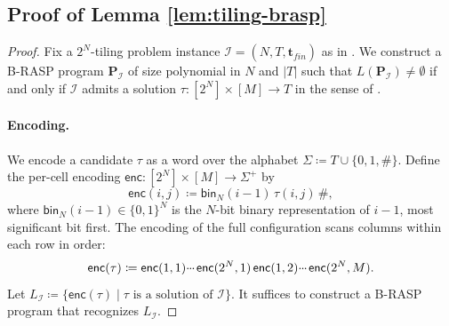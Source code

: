 \documentclass{article} %
\newcommand{\enc}{\mathsf{enc}}
\newcommand{\bin}{\mathsf{bin}}
\newcommand{\bnfdef}{\coloneqq}
\newcommand{\sym}[1]{\mathrm{#1}}
\newcommand{\alphabet}{\Sigma}
\newcommand{\brasp}{\boldsymbol{P}}
\newcommand{\Lang}{L}
\newcommand{\kplus}{^+}
\newcommand{\TI}{\mathcal{I}}
\newcommand{\tileset}{T}
\newcommand{\tilefin}{\boldsymbol{t}_{\mathit{fin}}}
\newcommand{\mydots}{%
  \ifmmode
    \mathord{.}\mkern-1mu\mathord{.}\mkern-1mu\mathord{.}%
  \else
    .\kern-0.1em.\kern-0.1em.%
  \fi
}
\newcommand{\mycdots}{%
  \ifmmode
    \mathord{\raisebox{0.45ex}{\ensuremath{\mydots}}}\mkern2mu%
  \else
    \raisebox{0.45ex}{.\kern-0.1em.\kern-0.1em.}\kern0.1em%
  \fi
}
\renewcommand{\cdots}{\mycdots}%
\begin{document}
\subsection{Proof of Lemma \ref{lem:tiling-brasp}}\label{app:tiling-brasp}
\lemTilingBrasp*
\begin{proof}
Fix a $2^N$-tiling problem instance $\TI = (N, \tileset, \tilefin)$ as in .
We construct a B-RASP program $\brasp_\TI$ of size polynomial in $N$ and $|\tileset|$ such that $\Lang(\brasp_\TI) \ne \emptyset$ if and only if $\TI$ admits a solution $\tau \colon [2^N] \times [M] \to \tileset$ in the sense of .

\paragraph{Encoding.}
We encode a candidate $\tau$ as a word over the alphabet $\alphabet \bnfdef \tileset \cup \{\sym{0}, \sym{1}, \sym{\#}\}$.
Define the per-cell encoding $\enc \colon [2^N] \times [M] \to \alphabet\kplus$ by
\begin{equation}\label{eq:enc}
\enc(i,j) \bnfdef \bin_N(i-1)\, \tau(i,j)\, \sym{\#},
\end{equation}
where $\bin_N(i-1) \in \{\sym{0},\sym{1}\}^N$ is the $N$-bit binary representation of $i-1$, most significant bit first.
The encoding of the full configuration scans columns within each row in order:
\begin{equation}\label{eq:enc-full}
\enc(\tau) \bnfdef \enc(1,1) \cdots \enc(2^N,1)\, \enc(1,2) \cdots \enc(2^N,M).
\end{equation}
Let $\Lang_\TI \bnfdef \{\enc(\tau) \mid \tau \text{ is a solution of } \TI\}$. It suffices to construct a B-RASP program that recognizes $\Lang_\TI$.


\end{proof}
\end{document}

